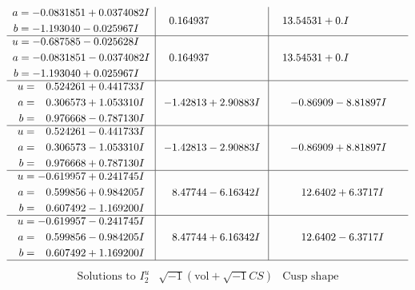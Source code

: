 \documentclass[1p]{elsarticle_modified}
\theoremstyle{definition}
\newcommand{\I}{\sqrt{-1}}
\begin{document}
$$\begin{array}{c|c|c}
\begin{aligned}
a &= -0.0831851 + 0.0374082 I \\
b &= -1.193040 - 0.025967 I\end{aligned}
 & \phantom{-}0.164937\phantom{ +0.000000I} & \phantom{-}13.54531 + 0. I\phantom{ +0.000000I} \\ \hline\begin{aligned}
u &= -0.687585 - 0.025628 I \\
a &= -0.0831851 - 0.0374082 I \\
b &= -1.193040 + 0.025967 I\end{aligned}
 & \phantom{-}0.164937\phantom{ +0.000000I} & \phantom{-}13.54531 + 0. I\phantom{ +0.000000I} \\ \hline\begin{aligned}
u &= \phantom{-}0.524261 + 0.441733 I \\
a &= \phantom{-}0.306573 + 1.053310 I \\
b &= \phantom{-}0.976668 - 0.787130 I\end{aligned}
 & -1.42813 + 2.90883 I & -0.86909 - 8.81897 I \\ \hline\begin{aligned}
u &= \phantom{-}0.524261 - 0.441733 I \\
a &= \phantom{-}0.306573 - 1.053310 I \\
b &= \phantom{-}0.976668 + 0.787130 I\end{aligned}
 & -1.42813 - 2.90883 I & -0.86909 + 8.81897 I \\ \hline\begin{aligned}
u &= -0.619957 + 0.241745 I \\
a &= \phantom{-}0.599856 + 0.984205 I \\
b &= \phantom{-}0.607492 - 1.169200 I\end{aligned}
 & \phantom{-}8.47744 - 6.16342 I & \phantom{-}12.6402 + 6.3717 I \\ \hline\begin{aligned}
u &= -0.619957 - 0.241745 I \\
a &= \phantom{-}0.599856 - 0.984205 I \\
b &= \phantom{-}0.607492 + 1.169200 I\end{aligned}
 & \phantom{-}8.47744 + 6.16342 I & \phantom{-}12.6402 - 6.3717 I\\
 \hline 
 \end{array}$$\newpage$$\begin{array}{c|c|c}  
\text{Solutions to }I^u_{2}& \I (\text{vol} + \sqrt{-1}CS) & \text{Cusp shape}\\

\end{array}$$
\end{document}
